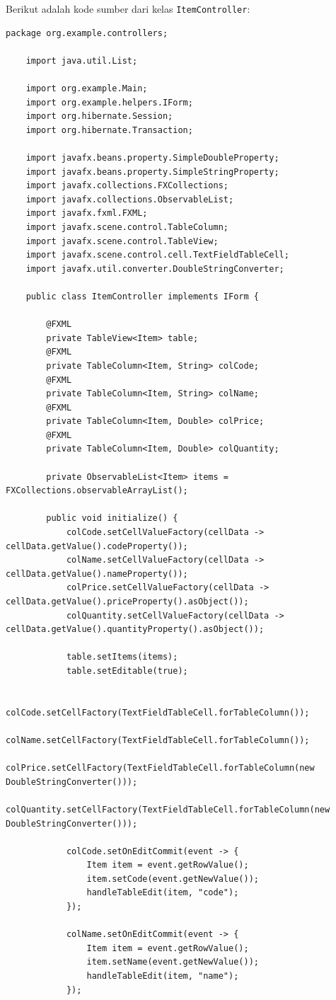 Berikut adalah kode sumber dari kelas \texttt{ItemController}:

\begin{lstlisting}[style=JavaStyle]
	package org.example.controllers;
	
	import java.util.List;
	
	import org.example.Main;
	import org.example.helpers.IForm;
	import org.hibernate.Session;
	import org.hibernate.Transaction;
	
	import javafx.beans.property.SimpleDoubleProperty;
	import javafx.beans.property.SimpleStringProperty;
	import javafx.collections.FXCollections;
	import javafx.collections.ObservableList;
	import javafx.fxml.FXML;
	import javafx.scene.control.TableColumn;
	import javafx.scene.control.TableView;
	import javafx.scene.control.cell.TextFieldTableCell;
	import javafx.util.converter.DoubleStringConverter;
	
	public class ItemController implements IForm {
		
		@FXML
		private TableView<Item> table;
		@FXML
		private TableColumn<Item, String> colCode;
		@FXML
		private TableColumn<Item, String> colName;
		@FXML
		private TableColumn<Item, Double> colPrice;
		@FXML
		private TableColumn<Item, Double> colQuantity;
		
		private ObservableList<Item> items = FXCollections.observableArrayList();
		
		public void initialize() {
			colCode.setCellValueFactory(cellData -> cellData.getValue().codeProperty());
			colName.setCellValueFactory(cellData -> cellData.getValue().nameProperty());
			colPrice.setCellValueFactory(cellData -> cellData.getValue().priceProperty().asObject());
			colQuantity.setCellValueFactory(cellData -> cellData.getValue().quantityProperty().asObject());
			
			table.setItems(items);
			table.setEditable(true);
			
			colCode.setCellFactory(TextFieldTableCell.forTableColumn());
			colName.setCellFactory(TextFieldTableCell.forTableColumn());
			colPrice.setCellFactory(TextFieldTableCell.forTableColumn(new DoubleStringConverter()));
			colQuantity.setCellFactory(TextFieldTableCell.forTableColumn(new DoubleStringConverter()));
			
			colCode.setOnEditCommit(event -> {
				Item item = event.getRowValue();
				item.setCode(event.getNewValue());
				handleTableEdit(item, "code");
			});
			
			colName.setOnEditCommit(event -> {
				Item item = event.getRowValue();
				item.setName(event.getNewValue());
				handleTableEdit(item, "name");
			});
			

\end{lstlisting}
